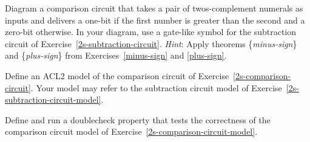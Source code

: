 \begin{ExerciseList}
\Exercise \label{2s-comparison-circuit}
Diagram a comparison circuit that takes a pair of
twos-complement numerals as inputs and delivers a one-bit
if the first number is greater than the second
and a zero-bit otherwise.
In your diagram, use a gate-like symbol
for the subtraction circuit of Exercise~\ref{2s-subtraction-circuit}.
\emph{Hint}: Apply theorems \{\emph{minus-sign}\} and \{\emph{plus-sign}\}
from Exercises~\ref{minus-sign} and \ref{plus-sign}.

\Exercise \label{2s-comparison-circuit-model}
Define an ACL2 model of the comparison circuit
of Exercise~\ref{2s-comparison-circuit}.
Your model may refer to the subtraction circuit model
of Exercise~\ref{2s-subtraction-circuit-model}.

\Exercise Define and run a doublecheck property
that tests the correctness of the comparison circuit model
of Exercise~\ref{2s-comparison-circuit-model}.

\end{ExerciseList}

